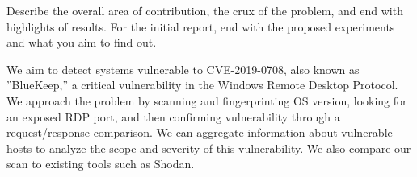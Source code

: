 Describe the overall area of contribution, the crux of the problem, 
and end with highlights of results. For the initial report, end with
the proposed experiments and what you aim to find out.

We aim to detect systems vulnerable to CVE-2019-0708, also 
known as ''BlueKeep,'' a critical vulnerability in the Windows 
Remote Desktop Protocol. We approach the problem by
scanning and fingerprinting OS version, looking for an 
exposed RDP port, and then confirming vulnerability through
a request/response comparison. We can aggregate information
about vulnerable hosts to analyze the scope and severity of 
this vulnerability. We also compare our scan to existing tools
such as Shodan.

